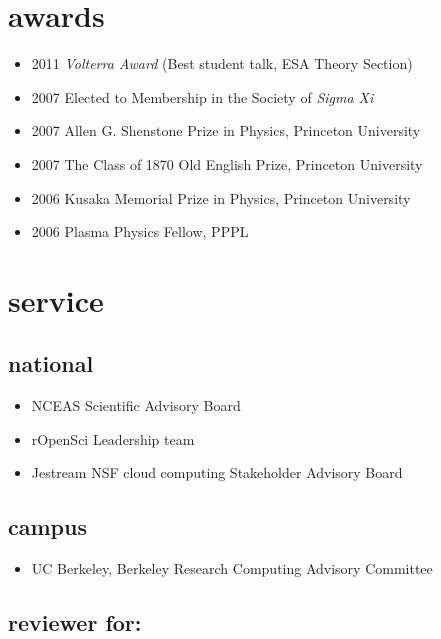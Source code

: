 \documentclass[10pt,sans]{moderncv}        %
\providecommand{\tightlist}{%
    \setlength{\itemsep}{0pt}\setlength{\parskip}{0pt}}
\begin{document}
\section{awards}\label{awards}

\begin{itemize}
\tightlist
\item
  2011 \emph{Volterra Award} (Best student talk, ESA Theory Section)
\item
  2007 Elected to Membership in the Society of \emph{Sigma Xi}
\item
  2007 Allen G. Shenstone Prize in Physics, Princeton University
\item
  2007 The Class of 1870 Old English Prize, Princeton University
\item
  2006 Kusaka Memorial Prize in Physics, Princeton University
\item
  2006 Plasma Physics Fellow, PPPL
\end{itemize}

\section{service}\label{service}

\subsection{national}\label{national}

\begin{itemize}
\tightlist
\item
  NCEAS Scientific Advisory Board
\item
  rOpenSci Leadership team
\item
  Jestream NSF cloud computing Stakeholder Advisory Board
\end{itemize}

\subsection{campus}\label{campus}

\begin{itemize}
\tightlist
\item
  UC Berkeley, Berkeley Research Computing Advisory Committee
\end{itemize}

\subsection{reviewer for:}\label{reviewer-for}
\end{document}
